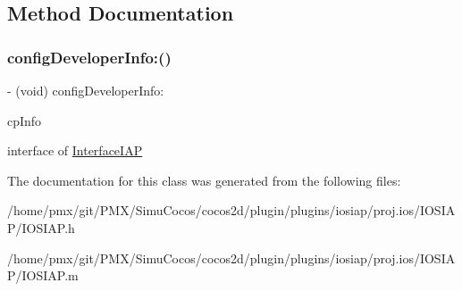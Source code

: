 \subsection{Method Documentation}
\mbox{\label{interfaceIOSIAP_a2b1f700a708db50efb07ecc7f31b82de}} 
\subsubsection{\texorpdfstring{config\+Developer\+Info\+:()}{configDeveloperInfo:()}}
{\footnotesize\ttfamily -\/ (void) config\+Developer\+Info\+: \begin{DoxyParamCaption}\item[{(N\+S\+Mutable\+Dictionary$\ast$)}]{cp\+Info }\end{DoxyParamCaption}}

interface of \hyperlink{classInterfaceIAP-p}{Interface\+I\+AP} 

The documentation for this class was generated from the following files\+:\begin{DoxyCompactItemize}
\item 
/home/pmx/git/\+P\+M\+X/\+Simu\+Cocos/cocos2d/plugin/plugins/iosiap/proj.\+ios/\+I\+O\+S\+I\+A\+P/I\+O\+S\+I\+A\+P.\+h\item 
/home/pmx/git/\+P\+M\+X/\+Simu\+Cocos/cocos2d/plugin/plugins/iosiap/proj.\+ios/\+I\+O\+S\+I\+A\+P/I\+O\+S\+I\+A\+P.\+m\end{DoxyCompactItemize}
